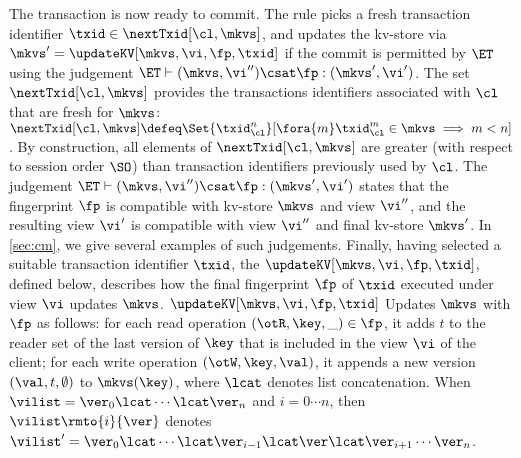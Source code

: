 The transaction is now ready to commit. The rule picks a fresh transaction identifier $\txid \in \nextTxid[\cl, \mkvs]$, 
and updates the kv-store via $\mkvs' = \updateKV[\mkvs, \vi, \fp, \txid]$
if the commit is permitted by $\ET$ using the judgement $\ET \vdash (\mkvs, \vi'') \csat \fp : (\mkvs', \vi')$.
The set $\nextTxid[\cl, \mkvs]$ provides the transactions identifiers
associated with $\cl$ that are fresh for  $\mkvs$:
\(
\nextTxid[\cl, \mkvs] \defeq 
\Set{\txid_{\cl}^{n}}[%
\fora{m} \txid_{\cl}^{m} \in \mkvs \implies m < n ]
\).
By construction, all elements of $\nextTxid[\cl, \mkvs]$ are greater (with respect to session order $\SO$) 
than transaction identifiers previously used by $\cl$. 
The judgement $\ET \vdash (\mkvs, \vi'') \csat \fp : (\mkvs', \vi')$
states that the fingerprint $\fp$ is compatible with kv-store $\mkvs$
and view $\vi''$, and the resulting view $\vi'$ 
is compatible with view \( \vi'' \) and final kv-store \( \mkvs' \).
In \cref{sec:cm}, we give several examples of such judgements.
Finally, having selected a suitable transaction identifier $\txid$,
the $\updateKV[\mkvs, \vi, \fp, \txid]$, defined below, describes how the final fingerprint $\fp$ of $\txid$ executed 
under view $\vi$ updates $\mkvs$.
$\updateKV[\mkvs, \vi, \fp, \txid]$ Updates $\mkvs$ with $\fp$ as follows: 
for each read operation $(\otR, \key, \_) \in \fp$, it adds $t$ 
to the reader set of the last version of $\key$ that is included in the view $\vi$ of the client; 
for each write operation $(\otW, \key, \val)$, it appends a new version $(\val, t, \emptyset)$ 
to $\mkvs(\key)$, where $\lcat$ denotes list concatenation.
When $\vilist = \ver_0 \lcat \cdots \lcat \ver_n$ and $i=0 \cdots n$, 
then $\vilist\rmto{i}{\ver}$ denotes 
$\vilist' = \ver_0 \lcat \cdots \lcat \ver_{i-1} \lcat \ver \lcat \ver_{i+1} \cdots \ver_{n}$. 

